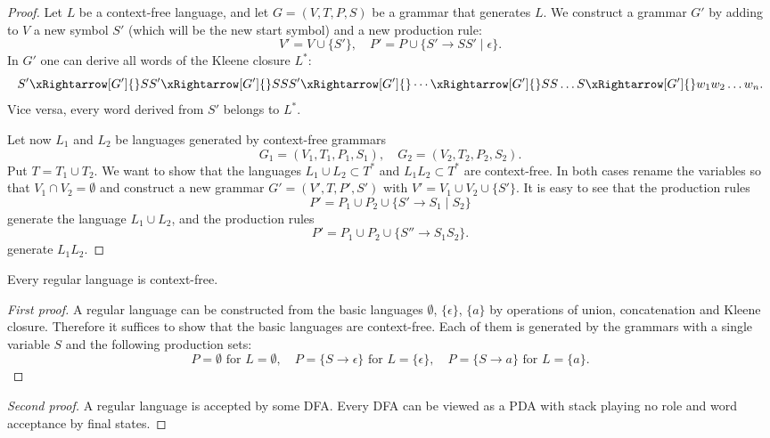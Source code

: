 \begin{page}


\begin{proof}
Let $L$ be a context-free language, and let $G = (V, T, P, S)$ be a grammar that generates $L$.
We construct a grammar $G'$ by adding to $V$ a new symbol $S'$ (which will be the new start symbol) and a new production rule:
\[
V' = V \cup \{S'\}, \quad P' = P \cup \{S' \to SS' \mid \epsilon\}.
\]
In $G'$ one can derive all words of the Kleene closure $L^*$:
\[
S' \xRightarrow[G']{} SS' \xRightarrow[G']{} SSS' \xRightarrow[G']{} \cdots \xRightarrow[G']{} SS \ldots S \xRightarrow[G']{} w_1 w_2 \ldots w_n.
\]
Vice versa, every word derived from $S'$ belongs to $L^*$.

Let now $L_1$ and $L_2$ be languages generated by context-free grammars
\[
G_1 = (V_1, T_1, P_1, S_1), \quad G_2 = (V_2, T_2, P_2, S_2).
\]
Put $T = T_1 \cup T_2$.
We want to show that the languages $L_1 \cup L_2 \subset T^*$ and $L_1L_2 \subset T^*$ are context-free.
In both cases rename the variables so that $V_1 \cap V_2 = \emptyset$
and construct a new grammar $G' = (V', T, P', S')$ with $V' = V_1 \cup V_2 \cup \{S'\}$.
It is easy to see that the production rules
\[
P' = P_1 \cup P_2 \cup \{S' \to S_1 \mid S_2\}
\]
generate the language $L_1 \cup L_2$,
and the production rules
\[
P' = P_1 \cup P_2 \cup \{S'' \to S_1S_2\}.
\]
generate $L_1L_2$.
\end{proof}


\end{page}

\begin{page}

\begin{cor}
Every regular language is context-free.
\end{cor}

\end{page}

\begin{page}

\begin{proof}[First proof]
A regular language can be constructed from the basic languages $\emptyset$, $\{\epsilon\}$, $\{a\}$
by operations of union, concatenation and Kleene closure.
Therefore it suffices to show that the basic languages are context-free.
Each of them is generated by the grammars with a single variable $S$ and the following production sets:
\[
P = \emptyset \text{ for }L = \emptyset, \quad P = \{S \to \epsilon\} \text{ for }L = \{\epsilon\}, \quad P = \{S \to a\} \text{ for }L = \{a\}.
\]
\end{proof}

\begin{proof}[Second proof]
A regular language is accepted by some DFA. 
Every DFA can be viewed as a PDA with stack playing no role and word acceptance by final states.
\end{proof}



\end{page}


